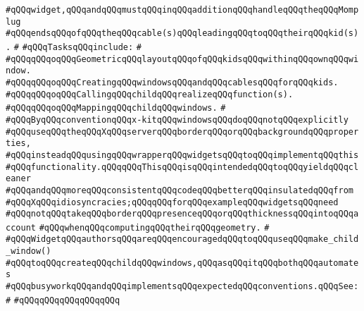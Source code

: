 \verb|#qQQqwidget,qQQqandqQQqmustqQQqinqQQqadditionqQQqhandleqQQqtheqQQqMomplug|\newline
\verb|#qQQqendsqQQqofqQQqtheqQQqcable(s)qQQqleadingqQQqtoqQQqtheirqQQqkid(s).|\newline
\verb|#|\newline
\verb|#qQQqTasksqQQqinclude:|\newline
\verb|#|\newline
\verb|#qQQqqQQqoqQQqGeometricqQQqlayoutqQQqofqQQqkidsqQQqwithinqQQqownqQQqwindow.|\newline
\verb|#qQQqqQQqoqQQqCreatingqQQqwindowsqQQqandqQQqcablesqQQqforqQQqkids.|\newline
\verb|#qQQqqQQqoqQQqCallingqQQqchildqQQqrealizeqQQqfunction(s).|\newline
\verb|#qQQqqQQqoqQQqMappingqQQqchildqQQqwindows.|\newline
\verb|#|\newline
\verb|#qQQqByqQQqconventionqQQqx-kitqQQqwindowsqQQqdoqQQqnotqQQqexplicitly|\newline
\verb|#qQQquseqQQqtheqQQqXqQQqserverqQQqborderqQQqorqQQqbackgroundqQQqproperties,|\newline
\verb|#qQQqinsteadqQQqusingqQQqwrapperqQQqwidgetsqQQqtoqQQqimplementqQQqthis|\newline
\verb|#qQQqfunctionality.qQQqqQQqThisqQQqisqQQqintendedqQQqtoqQQqyieldqQQqcleaner|\newline
\verb|#qQQqandqQQqmoreqQQqconsistentqQQqcodeqQQqbetterqQQqinsulatedqQQqfrom|\newline
\verb|#qQQqXqQQqidiosyncracies;qQQqqQQqforqQQqexampleqQQqwidgetsqQQqneed|\newline
\verb|#qQQqnotqQQqtakeqQQqborderqQQqpresenceqQQqorqQQqthicknessqQQqintoqQQqaccount|\newline
\verb|#qQQqwhenqQQqcomputingqQQqtheirqQQqgeometry.|\newline
\verb|#|\newline
\verb|#qQQqWidgetqQQqauthorsqQQqareqQQqencouragedqQQqtoqQQquseqQQqmake_child_window()|\newline
\verb|#qQQqtoqQQqcreateqQQqchildqQQqwindows,qQQqasqQQqitqQQqbothqQQqautomates|\newline
\verb|#qQQqbusyworkqQQqandqQQqimplementsqQQqexpectedqQQqconventions.qQQqSee:|\newline
\verb|#|\newline
\verb|#qQQqqQQqqQQqqQQqqQQq|\newline
